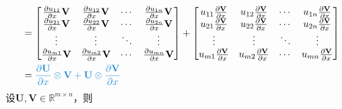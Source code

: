 \documentclass{ctexart}
\newcommand{\blue}[1]{\textcolor{Solarized-blue}{#1}}
\theoremstyle{definition}
\def \Uv {\mathbf{U}}
\def \Vv {\mathbf{V}}
\def \Rbb {\mathbb{R}}
\begin{document}
\begin{align*}
                                                       & = \begin{bmatrix}
        \frac{\partial u_{11}}{\partial x} \Vv & \frac{\partial u_{12}}{\partial x} \Vv & \cdots & \frac{\partial u_{1n}}{\partial x} \Vv \\
        \frac{\partial u_{21}}{\partial x} \Vv & \frac{\partial u_{22}}{\partial x} \Vv & \cdots & \frac{\partial u_{2n}}{\partial x} \Vv \\
        \vdots                                 & \vdots                                 & \ddots & \vdots                                 \\
        \frac{\partial u_{m1}}{\partial x} \Vv & \frac{\partial u_{m2}}{\partial x} \Vv & \cdots & \frac{\partial u_{mn}}{\partial x} \Vv \\
    \end{bmatrix} + \begin{bmatrix}
        u_{11} \frac{\partial \Vv}{\partial x} & u_{12} \frac{\partial \Vv}{\partial x} & \cdots & u_{1n} \frac{\partial \Vv}{\partial x} \\
        u_{21} \frac{\partial \Vv}{\partial x} & u_{22} \frac{\partial \Vv}{\partial x} & \cdots & u_{2n} \frac{\partial \Vv}{\partial x} \\
        \vdots                                 & \vdots                                 & \ddots & \vdots                                 \\
        u_{m1} \frac{\partial \Vv}{\partial x} & u_{m2} \frac{\partial \Vv}{\partial x} & \cdots & u_{mn} \frac{\partial \Vv}{\partial x} \\
    \end{bmatrix}                                          \\
                                                       & = \blue{\frac{\partial \Uv}{\partial x} \otimes \Vv + \Uv \otimes \frac{\partial \Vv}{\partial x}}
\end{align*}
设$\Uv, \Vv \in \Rbb^{m \times n}$，则
\end{document}

